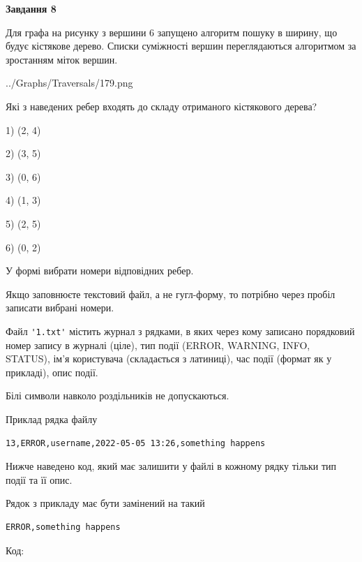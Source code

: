 \documentclass[12pt, ukrainian]{article}
\def\code#1{\Verb!#1!}
\begin{document}
{\begin {large}
{\begin {center}\textbf{Завдання 8}\end {center}}\par
Для графа на рисунку з вершини 6 запущено алгоритм пошуку в ширину, що будує кістякове дерево. Списки суміжності вершин переглядаються алгоритмом за зростанням міток вершин.\par
\begin{center}
	{../Graphs/Traversals/179.png}
\end{center}
\par Які з наведених ребер входять до складу отриманого кістякового дерева?\par
1) (2, 4)\par
2) (3, 5)\par
3) (0, 6)\par
4) (1, 3)\par
5) (2, 5)\par
6) (0, 2)\par
{\vskip 15pt} У формі вибрати номери відповідних ребер.


Якщо заповнюєте текстовий файл, а не гугл-форму, то потрібно через пробіл записа\-ти вибрані номери.\par
\newpage


Файл \code{'1.txt'} містить журнал з рядками, в яких через кому записано поряд\-ко\-вий номер запису в журналі (ціле), тип події (ERROR, WARNING, INFO, STATUS), ім'я користувача (складається з латиниці), час події (фор\-мат як у прикладі), опис події.

Білі символи навколо роздільників не допускаються.

Приклад рядка файлу



\begin{verbatim}
13,ERROR,username,2022-05-05 13:26,something happens
\end{verbatim}


Нижче наведено код, який має залишити у файлі в кожному рядку тільки тип події та її опис.

Рядок з прикладу має бути замінений на такий



\begin{verbatim}
ERROR,something happens
\end{verbatim}




Код:




\end{large}}
\end{document}
